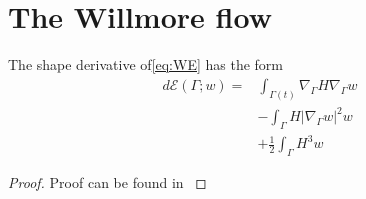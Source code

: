

\newpage
\section{The Willmore flow}%
\label{sec:evolutionary_pde_s_of_the_willmore_flow}


\begin{lemma}
The shape derivative of\eqref{eq:WE} has the form
\[
    \begin{split}
        d\mathcal{E} \left( \Gamma; w  \right)  =& \int_{\Gamma \left( t \right) }^{}  \nabla_{\Gamma } H  \nabla _{\Gamma } w    \\
    & - \int_{\Gamma }^{} H  |\nabla _{\Gamma }  w |^{2} w   \\
    &  + \frac{1}{2} \int_{\Gamma }^{} H^{3} w
    \end{split}
\]

\end{lemma}

\begin{proof}
    Proof can be found in \cite{willmore1996riemannian}
\end{proof}





